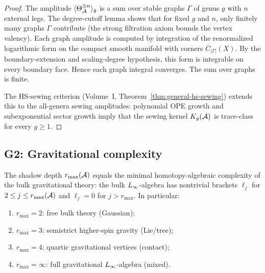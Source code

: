 \begin{proof}
The amplitude $\langle \Theta_{\mathcal{A}}^{\otimes n} \rangle_g$ is a sum over
stable graphs $\Gamma$ of genus $g$ with $n$ external legs. The degree-cutoff
lemma shows that for fixed $g$ and $n$, only finitely many graphs $\Gamma$
contribute (the strong filtration axiom bounds the vertex valency).
Each graph amplitude is computed by integration of the renormalized
logarithmic form on the compact smooth manifold with corners
$\overline{C}_{|\Gamma|}(X)$. By the boundary-extension and
scaling-degree hypothesis, this form is integrable on every boundary
face. Hence each graph integral converges. The sum over graphs is
finite.

The HS-sewing criterion (Volume~I, Theorem~\ref{thm:general-hs-sewing})
extends this to the all-genera sewing amplitudes: polynomial OPE growth
and subexponential sector growth imply that the sewing kernel
$K_g(\mathcal{A})$ is trace-class for every $g \ge 1$.
\end{proof}


\subsection{G2: Gravitational complexity}

\begin{theorem}
The shadow depth $r_{\max}(\mathcal{A})$ equals the minimal
homotopy-algebraic complexity of the bulk gravitational theory:
the bulk $L_\infty$-algebra has nontrivial brackets $\ell_j$
for $2 \le j \le r_{\max}(\mathcal{A})$ and $\ell_j = 0$ for $j > r_{\max}$.
In particular:
\begin{enumerate}[label=\textup{(\roman*)}]
\item $r_{\max} = 2$: free bulk theory (Gaussian);
\item $r_{\max} = 3$: semistrict higher-spin gravity (Lie/tree);
\item $r_{\max} = 4$: quartic gravitational vertices (contact);
\item $r_{\max} = \infty$: full gravitational $L_\infty$-algebra (mixed).
\end{enumerate}
\end{theorem}

